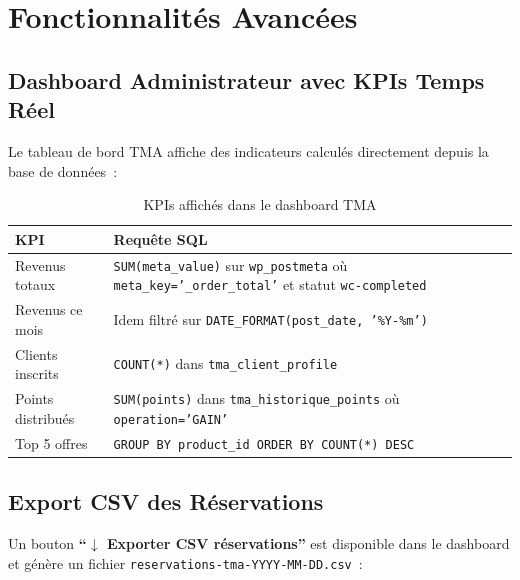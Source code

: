 \documentclass[12pt,a4paper]{report}
\begin{document}
\chapter{Fonctionnalit\'es Avanc\'ees}

\section{Dashboard Administrateur avec KPIs Temps R\'eel}

Le tableau de bord TMA affiche des indicateurs calcul\'es directement
depuis la base de donn\'ees~:

\begin{table}[H]
\centering
\caption{KPIs affich\'es dans le dashboard TMA}
\begin{tabularx}{\linewidth}{lX}
  \toprule
  \textbf{KPI} & \textbf{Requ\^ete SQL} \\
  \midrule
  Revenus totaux      & \texttt{SUM(meta\_value)} sur \texttt{wp\_postmeta} où \texttt{meta\_key='\_order\_total'} et statut \texttt{wc-completed} \\
  Revenus ce mois     & Idem filtré sur \texttt{DATE\_FORMAT(post\_date, '\%Y-\%m')} \\
  Clients inscrits    & \texttt{COUNT(*)} dans \texttt{tma\_client\_profile} \\
  Points distribu\'es & \texttt{SUM(points)} dans \texttt{tma\_historique\_points} où \texttt{operation='GAIN'} \\
  Top 5 offres        & \texttt{GROUP BY product\_id ORDER BY COUNT(*) DESC} \\
  \bottomrule
\end{tabularx}
\end{table}

\section{Export CSV des R\'eservations}

Un bouton \textbf{``$\downarrow$ Exporter CSV r\'eservations''} est disponible dans le
dashboard et g\'en\`ere un fichier \texttt{reservations-tma-YYYY-MM-DD.csv}~:

\end{document}
